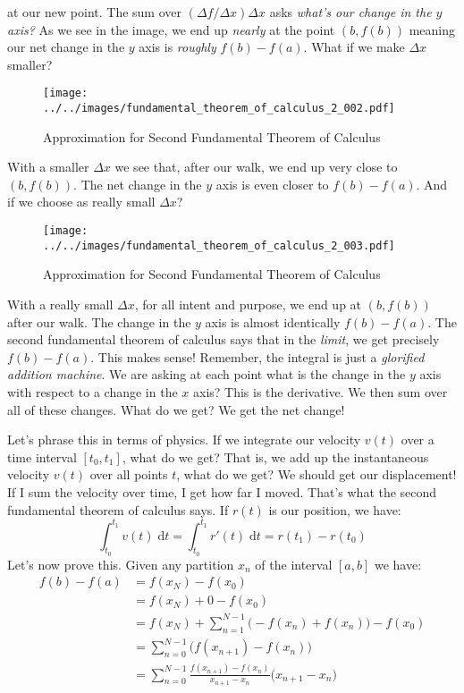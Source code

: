 \documentclass{article}
\theoremstyle{normal}
\theoremstyle{plain}
\begin{document}
    at our new point. The sum over $(\Delta{f}/\Delta{x})\Delta{x}$ asks
    \textit{what's our change in the $y$ axis?} As we see in the image, we end up
    \textit{nearly} at the point $(b, f(b))$ meaning our net change in the $y$
    axis is \textit{roughly} $f(b)-f(a)$. What if we make $\Delta{x}$ smaller?
    \begin{figure}[H]
        \centering
        \texttt{[image: ../../images/fundamental\_theorem\_of\_calculus\_2\_002.pdf]}
        \caption{Approximation for Second Fundamental Theorem of Calculus}
    \end{figure}
    With a smaller $\Delta{x}$ we see that, after our walk, we end up very close
    to $(b,f(b))$. The net change in the $y$ axis is even closer to
    $f(b)-f(a)$. And if we choose as really small $\Delta{x}$?
    \begin{figure}[H]
        \centering
        \texttt{[image: ../../images/fundamental\_theorem\_of\_calculus\_2\_003.pdf]}
        \caption{Approximation for Second Fundamental Theorem of Calculus}
    \end{figure}
    With a really small $\Delta{x}$, for all intent and purpose, we end up
    at $(b,f(b))$ after our walk. The change in the $y$ axis is almost
    identically $f(b)-f(a)$. The second fundamental theorem of calculus says
    that in the \textit{limit}, we get precisely $f(b)-f(a)$. This makes sense!
    Remember, the integral is just a \textit{glorified addition machine}. We
    are asking at each point what is the change in the $y$ axis with respect to
    a change in the $x$ axis? This is the derivative. We then sum over all of
    these changes. What do we get? We get the net change!
    \par\hfill\par
    Let's phrase this in terms of physics. If we integrate our velocity $v(t)$
    over a time interval $[t_{0},t_{1}]$, what do we get? That is, we add up
    the instantaneous velocity $v(t)$ over all points $t$, what do we get?
    We should get our displacement! If I sum the velocity over time, I get how
    far I moved. That's what the second fundamental theorem of calculus says.
    If $r(t)$ is our position, we have:
    \begin{equation}
        \int_{t_{0}}^{t_{1}}v(t)\;\textrm{d}t
            =\int_{t_{0}}^{t_{1}}r'(t)\;\textrm{d}t
            =r(t_{1})-r(t_{0})
    \end{equation}
    Let's now prove this. Given any partition $x_{n}$ of the interval $[a,b]$
    we have:
    \begin{align}
        f(b)-f(a)&=f(x_{N})-f(x_{0})\\
            &=f(x_{N})+0-f(x_{0})\\
            &=f(x_{N})+\sum_{n=1}^{N-1}\Big(-f(x_{n})+f(x_{n})\Big)-f(x_{0})\\
            &=\sum_{n=0}^{N-1}\Big(f(x_{n+1})-f(x_{n})\Big)\\
            &=\sum_{n=0}^{N-1}\frac{f(x_{n+1})-f(x_{n})}{x_{n+1}-x_{n}}
                \big(x_{n+1}-x_{n}\big)
    \end{align}
\end{document}
